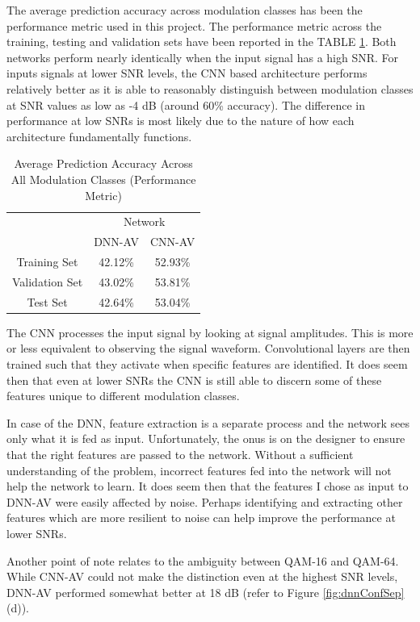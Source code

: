 \documentclass[journal,onecolumn]{IEEEtran}
\begin{document}
The average prediction accuracy across modulation classes has been the performance metric used in this project. The performance metric across the training, testing and validation sets have been reported in the TABLE \ref{tab:discuss}. Both networks perform nearly identically when the input signal has a high SNR. For inputs signals at lower SNR levels, the CNN based architecture performs relatively better as it is able to reasonably distinguish between modulation classes at SNR values as low as -4 dB (around 60\% accuracy). The difference in performance at low SNRs is most likely due to the nature of how each architecture fundamentally functions.

\begin{table}[h]
\centering
\caption{Average Prediction Accuracy Across All Modulation Classes (Performance Metric)}
\label{tab:discuss}
\begin{tabular}{ccc}
\hline
\multirow{2}{*}{} & \multicolumn{2}{c}{Network} \\
                  & DNN-AV       & CNN-AV      \\ \hline
Training Set      & 42.12\%      & 52.93\%     \\
Validation Set    & 43.02\%      & 53.81\%     \\
Test Set          & 42.64\%      & 53.04\%     \\ \hline
\end{tabular}
\end{table}

The CNN processes the input signal by looking at signal amplitudes. This is more or less equivalent to observing the signal waveform. Convolutional layers are then trained such that they activate when specific features are identified. It does seem then that even at lower SNRs the CNN is still able to discern some of these features unique to different modulation classes.

In case of the DNN, feature extraction is a separate process and the network sees only what it is fed as input. Unfortunately, the onus is on the designer to ensure that the right features are passed to the network. Without a sufficient understanding of the problem, incorrect features fed into the network will not help the network to learn. It does seem then that the features I chose as input to DNN-AV were easily affected by noise. Perhaps identifying and extracting other features which are more resilient to noise can help improve the performance at lower SNRs.

Another point of note relates to the ambiguity between QAM-16 and QAM-64. While CNN-AV could not make the distinction even at the highest SNR levels, DNN-AV performed somewhat better at 18 dB (refer to Figure \ref{fig:dnnConfSep} (d)).
\end{document}
